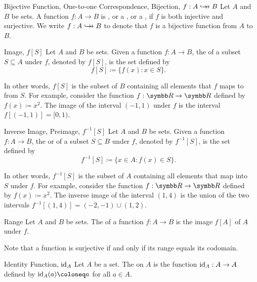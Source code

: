 \documentclass[12pt]{report}
\begin{document}
\begin{dfnbox}{Bijective Function, One-to-one Correspondence, Bijection, $f: A \hookrightarrow\!\!\!\!\to B$}
	Let $A$ and $B$ be sets. A function $f: A \to B$ is , or a , or a , if $f$ is both injective and surjective. We write $f: A \hookrightarrow\!\!\!\!\to B$ to denote that $f$ is a bijective function from $A$ to $B$.
\end{dfnbox}

\begin{dfnbox}{Image, $f[S]$}
	Let $A$ and $B$ be sets. Given a function $f: A \to B$, the  of a subset $S \subseteq A$ under $f$, denoted by $f[S]$, is the set defined by
	\[ f[S] \coloneq \{ f(x) : x \in S \}. \]
\end{dfnbox}

In other words, $f[S]$ is the subset of $B$ containing all elements that $f$ maps to from $S$. For example, consider the function $f: \R \to \R$ defined by $f(x) \coloneq x^2$. The image of the interval $(-1, 1)$ under $f$ is the interval $f[(-1, 1)] = [0, 1)$.

\begin{dfnbox}{Inverse Image, Preimage, $f^{-1}[S]$}
	Let $A$ and $B$ be sets. Given a function $f: A \to B$, the  or  of a subset $S \subseteq B$ under $f$, denoted by $f^{-1}[S]$, is the set defined by
	\[ f^{-1}[S] \coloneq \{ x \in A : f(x) \in S \}. \]
\end{dfnbox}

In other words, $f^{-1}[S]$ is the subset of $A$ containing all elements that map into $S$ under $f$. For example, consider the function $f: \R \to \R$ defined by $f(x) \coloneq x^2$. The inverse image of the interval $(1, 4)$ is the union of the two intervals $f^{-1}[(1, 4)] = (-2, -1) \cup (1, 2)$.

\begin{dfnbox}{Range}
	Let $A$ and $B$ be sets. The  of a function $f: A \to B$ is the image $f[A]$ of $A$ under $f$.
\end{dfnbox}

Note that a function is surjective if and only if its range equals its codomain.

\begin{dfnbox}{Identity Function, $\operatorname{id}_A$}
	Let $A$ be a set. The  on $A$ is the function $\operatorname{id}_A: A \to A$ defined by $\id_A(a) \coloneq a$ for all $a \in A$.
\end{dfnbox}
\end{document}
